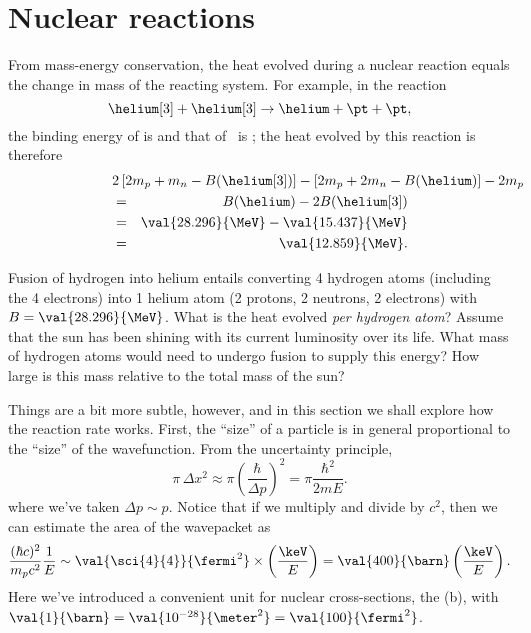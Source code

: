 \section{Nuclear reactions}

From mass-energy conservation, the heat evolved during a nuclear reaction equals the change in mass of the reacting system. For example, in the reaction
\[
	\helium[3] + \helium[3] \to \helium + \pt + \pt,
\]
the binding energy of \helium[3] is  and that of \helium\ is ; the heat evolved by this reaction is therefore
\begin{eqnarray*}
	\lefteqn{2\left[2m_{p}+m_{n}-B(\helium[3])\right] - \left[2m_{p}+2m_{n}-B(\helium)\right] - 2m_{p}} \\
	&=& B(\helium)-2B(\helium[3])\\
	&=& \val{28.296}{\MeV} - \val{15.437}{\MeV}\\ &=& \val{12.859}{\MeV}.
\end{eqnarray*}

\begin{exercisebox}
\label{ex.Q-hydrogen-helium}
Fusion of hydrogen into helium entails converting 4 hydrogen atoms (including the 4 electrons) into 1 helium atom (2 protons, 2 neutrons, 2 electrons) with $B = \val{28.296}{\MeV}$. What is the heat evolved \emph{per hydrogen atom}? Assume that the sun has been shining with its current luminosity over its life. What mass of hydrogen atoms would need to undergo fusion to supply this energy? How large is this mass relative to the total mass of the sun? 
\end{exercisebox}

 Things are a bit more subtle, however, and in this section we shall explore how the reaction rate works. First, the ``size'' of a particle is in general proportional to the ``size'' of the wavefunction. From the uncertainty principle, 
\[\pi\,\Delta x^{2} \approx \pi \left(\frac{\hbar}{\Delta p}\right)^{2} = \pi\frac{\hbar^{2}}{2mE}.\]
where we've taken $\Delta p\sim p$.
Notice that if we multiply and divide by $c^{2}$, then we can estimate the area of the wavepacket as
\[
	\frac{(\hbar c)^{2}}{m_{p} c^{2}} \frac{1}{E} \sim \val{\sci{4}{4}}{\fermi^{2}} \times \left(\frac{\keV}{E}\right) = \val{400}{\barn}\left(\frac{\keV}{E}\right).
\]	
Here we've introduced a convenient unit for nuclear cross-sections, the  (b), with $\val{1}{\barn} = \val{10^{-28}}{\meter^{2}} = \val{100}{\fermi^{2}}$.

